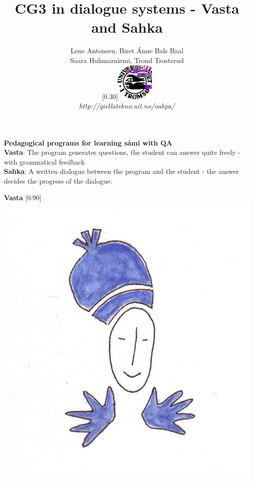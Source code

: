 \documentclass[landscape,norsk,11pt]{seminar}
\title{CG3 in dialogue systems - Vasta and Sahka}
\author{Lene Antonsen, Biret Ánne Bals Baal\\
Saara Huhmarniemi, Trond Trosterud \\
 \scalebox{0.30}[0.30]{\includegraphics{img/logoWeb070sh.jpg}} \\
  \textit{http://giellatekno.uit.no/oahpa/}}
\begin{document}
\begin{slide}

\maketitle

\newslide
\textbf{Pedagogical programs for learning sámi with QA}\\
\newline
\textbf{Vasta}: The program generates questions, the student can answer quite freely - with grammatical feedback \\ \newline
\textbf{Sahka}: A written dialogue between the program and the student - the answer decides the progress of the dialogue.

\newslide
\textbf{Vasta}
\scalebox{0.90}[0.90]{\includegraphics{img/vasta.png}} \\


\end{slide}
\end{document}
